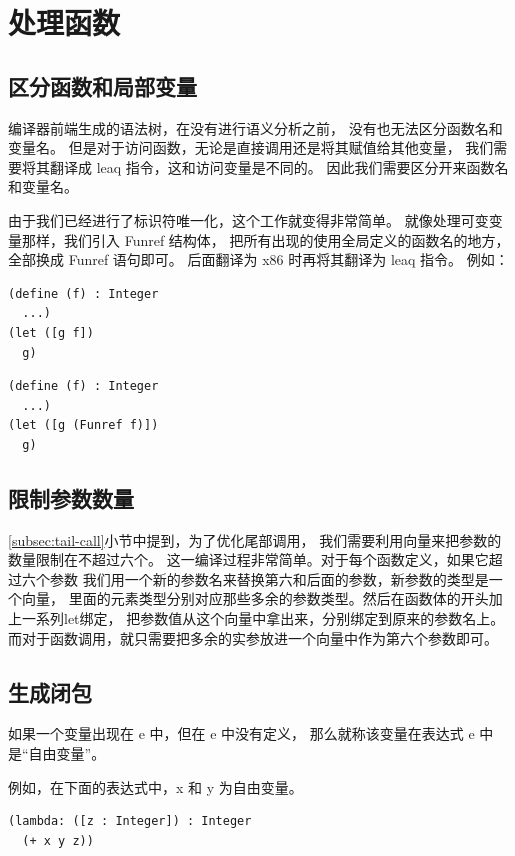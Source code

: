 
\section{处理函数}

\subsection{区分函数和局部变量}

编译器前端生成的语法树，在没有进行语义分析之前，
没有也无法区分函数名和变量名。
但是对于访问函数，无论是直接调用还是将其赋值给其他变量，
我们需要将其翻译成 leaq 指令，这和访问变量是不同的。
因此我们需要区分开来函数名和变量名。

由于我们已经进行了标识符唯一化，这个工作就变得非常简单。
就像处理可变变量那样，我们引入 Funref 结构体，
把所有出现的使用全局定义的函数名的地方，全部换成 Funref 语句即可。
后面翻译为 x86 时再将其翻译为 leaq 指令。
例如：

\begin{transformation}
\begin{lstlisting}
(define (f) : Integer
  ...)
(let ([g f])
  g)
\end{lstlisting}
\compilesto
\begin{lstlisting}
(define (f) : Integer
  ...)
(let ([g (Funref f)])
  g)
\end{lstlisting}
\end{transformation}


\subsection{限制参数数量}
\ref{subsec:tail-call}小节中提到，为了优化尾部调用，
我们需要利用向量来把参数的数量限制在不超过六个。
这一编译过程非常简单。对于每个函数定义，如果它超过六个参数
我们用一个新的参数名来替换第六和后面的参数，新参数的类型是一个向量，
里面的元素类型分别对应那些多余的参数类型。然后在函数体的开头加上一系列let绑定，
把参数值从这个向量中拿出来，分别绑定到原来的参数名上。
而对于函数调用，就只需要把多余的实参放进一个向量中作为第六个参数即可。


\subsection{生成闭包}

如果一个变量出现在 e 中，但在 e 中没有定义，
那么就称该变量在表达式 e 中是“自由变量”。

例如，在下面的表达式中，x 和 y 为自由变量。
\begin{lstlisting}
(lambda: ([z : Integer]) : Integer
  (+ x y z))
\end{lstlisting}

